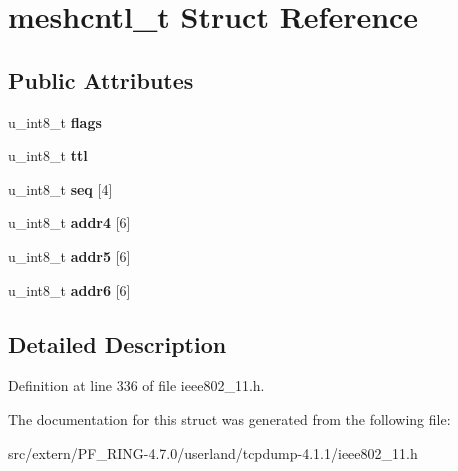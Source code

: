 \hypertarget{structmeshcntl__t}{
\section{meshcntl\_\-t Struct Reference}
\label{structmeshcntl__t}
}
\subsection*{Public Attributes}
\begin{DoxyCompactItemize}
\item 
\hypertarget{structmeshcntl__t_a4e4d4ca5fca27d7c84564ef61a68803c}{
u\_\-int8\_\-t {\bfseries flags}}
\label{structmeshcntl__t_a4e4d4ca5fca27d7c84564ef61a68803c}

\item 
\hypertarget{structmeshcntl__t_a1a83b4fdc222b2ffa62efd25813bd1ae}{
u\_\-int8\_\-t {\bfseries ttl}}
\label{structmeshcntl__t_a1a83b4fdc222b2ffa62efd25813bd1ae}

\item 
\hypertarget{structmeshcntl__t_ab71c4d0f294e5c3804e4144e2c1c7301}{
u\_\-int8\_\-t {\bfseries seq} \mbox{[}4\mbox{]}}
\label{structmeshcntl__t_ab71c4d0f294e5c3804e4144e2c1c7301}

\item 
\hypertarget{structmeshcntl__t_ac5043d73fde09607d7f9c5bd8f45c49d}{
u\_\-int8\_\-t {\bfseries addr4} \mbox{[}6\mbox{]}}
\label{structmeshcntl__t_ac5043d73fde09607d7f9c5bd8f45c49d}

\item 
\hypertarget{structmeshcntl__t_a58bfd23c888ab0f89df9de57edbbc031}{
u\_\-int8\_\-t {\bfseries addr5} \mbox{[}6\mbox{]}}
\label{structmeshcntl__t_a58bfd23c888ab0f89df9de57edbbc031}

\item 
\hypertarget{structmeshcntl__t_a859de287fda369b73e43e429e4715d57}{
u\_\-int8\_\-t {\bfseries addr6} \mbox{[}6\mbox{]}}
\label{structmeshcntl__t_a859de287fda369b73e43e429e4715d57}

\end{DoxyCompactItemize}


\subsection{Detailed Description}


Definition at line 336 of file ieee802\_\-11.h.



The documentation for this struct was generated from the following file:\begin{DoxyCompactItemize}
\item 
src/extern/PF\_\-RING-\/4.7.0/userland/tcpdump-\/4.1.1/ieee802\_\-11.h\end{DoxyCompactItemize}

